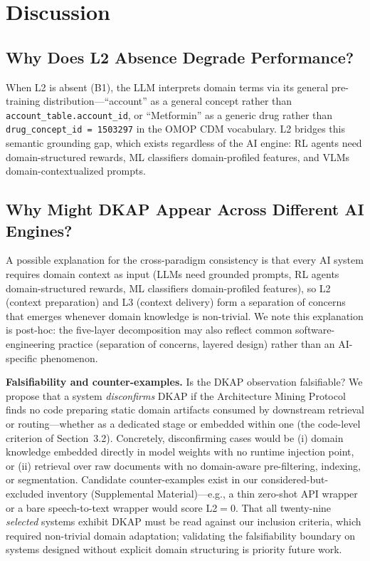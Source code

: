 \documentclass[fleqn,10pt,lineno]{wlpeerj}
\begin{document}
\section{Discussion}

\subsection{Why Does L2 Absence Degrade Performance?}

When L2 is absent (B1), the LLM interprets domain terms via its general pre-training distribution---``account'' as a general concept rather than \texttt{account\_table.account\_id}, or ``Metformin'' as a generic drug rather than \texttt{drug\_concept\_id = 1503297} in the OMOP CDM vocabulary. L2 bridges this semantic grounding gap, which exists regardless of the AI engine: RL agents need domain-structured rewards, ML classifiers domain-profiled features, and VLMs domain-contextualized prompts.

\subsection{Why Might DKAP Appear Across Different AI Engines?}

A possible explanation for the cross-paradigm consistency is that every AI system requires domain context as input (LLMs need grounded prompts, RL agents domain-structured rewards, ML classifiers domain-profiled features), so L2 (context preparation) and L3 (context delivery) form a separation of concerns that emerges whenever domain knowledge is non-trivial. We note this explanation is post-hoc: the five-layer decomposition may also reflect common software-engineering practice (separation of concerns, layered design) rather than an AI-specific phenomenon.

\textbf{Falsifiability and counter-examples.} Is the DKAP observation falsifiable? We propose that a system \textit{disconfirms} DKAP if the Architecture Mining Protocol finds no code preparing static domain artifacts consumed by downstream retrieval or routing---whether as a dedicated stage or embedded within one (the code-level criterion of Section~3.2). Concretely, disconfirming cases would be (i) domain knowledge embedded directly in model weights with no runtime injection point, or (ii) retrieval over raw documents with no domain-aware pre-filtering, indexing, or segmentation. Candidate counter-examples exist in our considered-but-excluded inventory (Supplemental Material)---e.g., a thin zero-shot API wrapper or a bare speech-to-text wrapper would score L2$=$0. That all twenty-nine \textit{selected} systems exhibit DKAP must be read against our inclusion criteria, which required non-trivial domain adaptation; validating the falsifiability boundary on systems designed without explicit domain structuring is priority future work.
\end{document}
